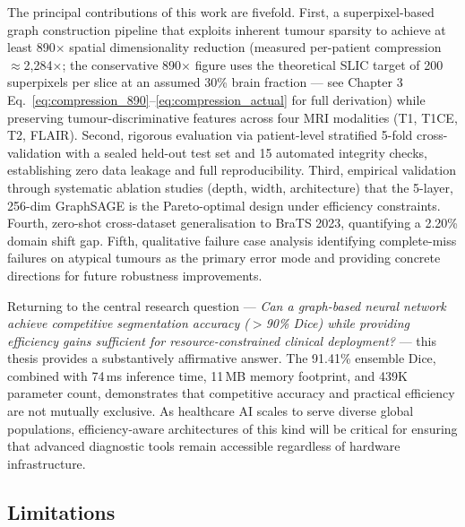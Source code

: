 The principal contributions of this work are fivefold. First, a superpixel-based graph construction pipeline that exploits inherent tumour sparsity to achieve at least 890$\times$ spatial dimensionality reduction (measured per-patient compression $\approx$2,284$\times$; the conservative 890$\times$ figure uses the theoretical SLIC target of 200 superpixels per slice at an assumed 30\% brain fraction — see Chapter 3 Eq.~\ref{eq:compression_890}--\ref{eq:compression_actual} for full derivation) while preserving tumour-discriminative features across four MRI modalities (T1, T1CE, T2, FLAIR). Second, rigorous evaluation via patient-level stratified 5-fold cross-validation with a sealed held-out test set and 15 automated integrity checks, establishing zero data leakage and full reproducibility. Third, empirical validation through systematic ablation studies (depth, width, architecture) that the 5-layer, 256-dim GraphSAGE is the Pareto-optimal design under efficiency constraints. Fourth, zero-shot cross-dataset generalisation to BraTS 2023, quantifying a 2.20\% domain shift gap. Fifth, qualitative failure case analysis identifying complete-miss failures on atypical tumours as the primary error mode and providing concrete directions for future robustness improvements.

Returning to the central research question — \textit{Can a graph-based neural network achieve competitive segmentation accuracy ($>$90\% Dice) while providing efficiency gains sufficient for resource-constrained clinical deployment?} — this thesis provides a substantively affirmative answer. The 91.41\% ensemble Dice, combined with 74\,ms inference time, 11\,MB memory footprint, and 439K parameter count, demonstrates that competitive accuracy and practical efficiency are not mutually exclusive. As healthcare AI scales to serve diverse global populations, efficiency-aware architectures of this kind will be critical for ensuring that advanced diagnostic tools remain accessible regardless of hardware infrastructure.


\subsection{Limitations}

